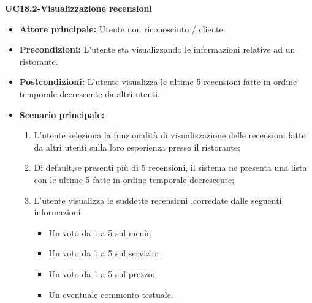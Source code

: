 \textbf{UC18.2-Visualizzazione recensioni}
\begin{itemize}
\item \textbf{Attore principale:} Utente non riconosciuto / cliente.
\item \textbf{Precondizioni:} L'utente sta visualizzando le informazioni relative ad un ristorante.
\item \textbf{Postcondizioni:} L'utente visualizza le ultime 5 recensioni fatte in ordine temporale decrescente da altri utenti.
\item \textbf{Scenario principale:}
\begin{enumerate}
    \item L'utente seleziona la funzionalità di visualizzazione delle recensioni fatte da altri utenti
    sulla loro esperienza presso il ristorante;
    \item Di default,se presenti più di 5 recensioni, il sistema ne presenta una lista con le ultime 5 fatte in ordine temporale decrescente;
    \item L'utente visualizza le suddette recensioni ,corredate dalle seguenti informazioni:
    \begin{itemize}
        \item Un voto da 1 a 5 sul menù;
        \item Un voto da 1 a 5 sul servizio;
        \item Un voto da 1 a 5 sul prezzo;
        \item Un eventuale commento testuale.
    \end{itemize}
\end{enumerate}
\end{itemize}
